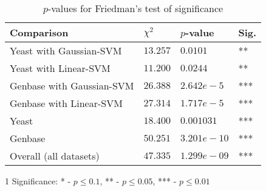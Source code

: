 \begin{table}[t]
    \footnotesize
    \centering
    \caption{$p$-values for Friedman's test of significance}
    \label{results:friedman}
    \begin{threeparttable}
    \begin{tabular}{@{}llll@{}}
    \toprule
    Comparison                & $\chi^2$    & $p$-value       & Sig.\tnote{1}   \\ \midrule
    Yeast with Gaussian-SVM   & $13.257$    & $0.0101$        & **              \\
    Yeast with Linear-SVM     & $11.200$    & $0.0244$        & **              \\
    Genbase with Gaussian-SVM & $26.388$    & $2.642e-5$      & ***             \\
    Genbase with Linear-SVM   & $27.314$    & $1.717e-5$      & ***             \\ \cmidrule{1-4}
    Yeast                     & $18.400$    & $0.001031$      & ***             \\
    Genbase                   & $50.251$    & $3.201e-10$     & ***             \\ \cmidrule{1-4}
    Overall (all datasets)    & $47.335$    & $1.299e-09$     & ***             \\ \bottomrule
    \end{tabular}
    \begin{tablenotes}
        \item[1] Significance: * - $p \leq 0.1$, ** - $p \leq 0.05$, *** - $p \leq 0.01$
    \end{tablenotes}
    \end{threeparttable}
\end{table}
